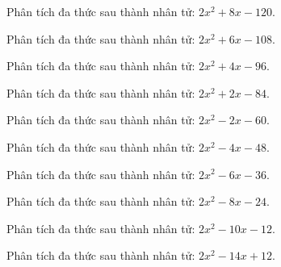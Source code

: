 \begin{bt}
	Phân tích đa thức sau thành nhân tử: $2 x^2 + 8 x - 120$.
\end{bt}
\begin{bt}
	Phân tích đa thức sau thành nhân tử: $2 x^2 + 6 x - 108$.
\end{bt}
\begin{bt}
	Phân tích đa thức sau thành nhân tử: $2 x^2 + 4 x - 96$.
\end{bt}
\begin{bt}
	Phân tích đa thức sau thành nhân tử: $2 x^2 + 2 x - 84$.
\end{bt}
\begin{bt}
	Phân tích đa thức sau thành nhân tử: $2 x^2 - 2 x - 60$.
\end{bt}
\begin{bt}
	Phân tích đa thức sau thành nhân tử: $2 x^2 - 4 x - 48$.
\end{bt}
\begin{bt}
	Phân tích đa thức sau thành nhân tử: $2 x^2 - 6 x - 36$.
\end{bt}
\begin{bt}
	Phân tích đa thức sau thành nhân tử: $2 x^2 - 8 x - 24$.
\end{bt}
\begin{bt}
	Phân tích đa thức sau thành nhân tử: $2 x^2 - 10 x - 12$.
\end{bt}
\begin{bt}
	Phân tích đa thức sau thành nhân tử: $2 x^2 - 14 x + 12$.
\end{bt}
